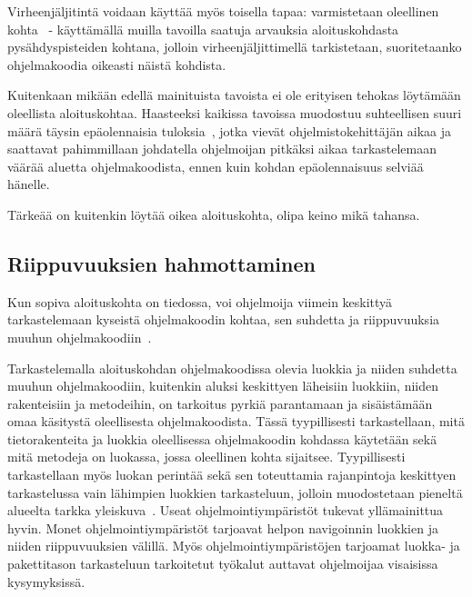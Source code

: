\documentclass[finnish]{tktltiki2}
\theoremstyle{definition}
\theoremstyle{remark}
\begin{document}
Virheenjäljitintä voidaan käyttää myös toisella tapaa: varmistetaan oleellinen kohta~\cite{eliciting-design-requirements-for-maintenance-oriented-ides} - käyttämällä muilla tavoilla saatuja arvauksia aloituskohdasta pysähdyspisteiden kohtana, jolloin virheenjäljittimellä tarkistetaan, suoritetaanko ohjelmakoodia oikeasti näistä kohdista.

Kuitenkaan mikään edellä mainituista tavoista ei ole erityisen tehokas löytämään oleellista aloituskohtaa. Haasteeksi kaikissa tavoissa muodostuu suhteellisen suuri määrä täysin epäolennaisia tuloksia~\cite{eliciting-design-requirements-for-maintenance-oriented-ides}, jotka vievät ohjelmistokehittäjän aikaa ja saattavat pahimmillaan johdatella ohjelmoijan pitkäksi aikaa tarkastelemaan väärää aluetta ohjelmakoodista, ennen kuin kohdan epäolennaisuus selviää hänelle.

Tärkeää on kuitenkin löytää oikea aloituskohta, olipa keino mikä tahansa.

\subsection{Riippuvuuksien hahmottaminen}
Kun sopiva aloituskohta on tiedossa, voi ohjelmoija viimein keskittyä tarkastelemaan kyseistä ohjelmakoodin kohtaa, sen suhdetta ja riippuvuuksia muuhun ohjelmakoodiin~\cite{questions-during-software-evolution-tasks}.

Tarkastelemalla aloituskohdan ohjelmakoodissa olevia luokkia ja niiden suhdetta muuhun ohjelmakoodiin, kuitenkin aluksi keskittyen läheisiin luokkiin, niiden rakenteisiin ja metodeihin, on tarkoitus pyrkiä parantamaan ja sisäistämään omaa käsitystä oleellisesta ohjelmakoodista. Tässä tyypillisesti tarkastellaan, mitä tietorakenteita ja luokkia oleellisessa ohjelmakoodin kohdassa käytetään sekä mitä metodeja on luokassa, jossa oleellinen kohta sijaitsee. Tyypillisesti tarkastellaan myös luokan perintää sekä sen toteuttamia rajanpintoja keskittyen
tarkastelussa vain lähimpien luokkien tarkasteluun, jolloin muodostetaan pieneltä alueelta tarkka yleiskuva~\cite{questions-during-software-evolution-tasks}.
Useat ohjelmointiympäristöt tukevat yllämainittua hyvin. Monet ohjelmointiympäristöt tarjoavat helpon navigoinnin luokkien ja niiden riippuvuuksien välillä. Myös ohjelmointiympäristöjen tarjoamat luokka- ja pakettitason tarkasteluun tarkoitetut työkalut auttavat ohjelmoijaa visaisissa kysymyksissä.
\end{document}
